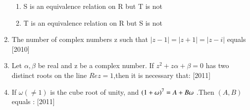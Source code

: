 \documentclass[journal,12pt,twocolumn,article]{IEEEtran}
\theoremstyle{remark}
\begin{document}
\begin{enumerate}[start = 14]
\begin{enumerate}
\item S is an equivalence relation on R but T is not
\item T is an equivalence relation on R but S is not

\end{enumerate}

\item The number of complex numbers z such that $|z-1|=|z+1|=|z-i|$ equals
\hfill{[2010]}

\begin{enumerate}
\end{enumerate}

\item Let $\alpha,\beta$ be real and z be a complex number. If $z^2 +z\alpha +\beta =0$  has two distinct roots on the line $Rez=1$,then it is necessary that:
\hfill{[2011]}
\begin{enumerate}
\end{enumerate}

\item If $\omega(\neq1)$ is the cube root of unity, and $\left(1+\omega \right)^7= A+ B\omega$ .Then $(A,B)$ equals :
\hfill{[2011]}                                     

\begin{enumerate}                                  
\end{enumerate}


\end{enumerate}
\end{document}
